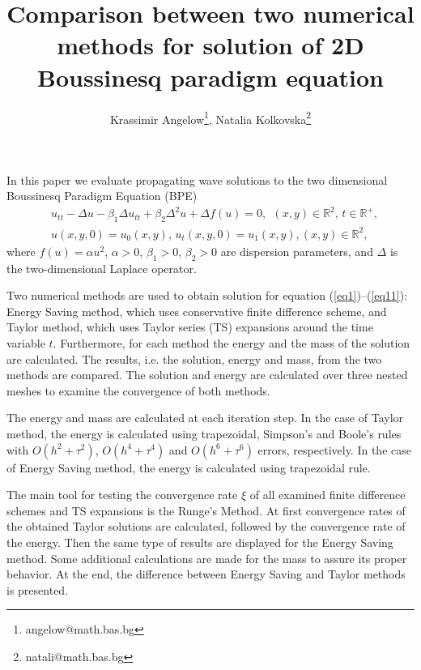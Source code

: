 \documentclass{article}
\newcommand{\RR}{\mathbb{R}}
\newcommand{\rf}[1]{(\ref{#1})}
\begin{document}
\title{Comparison between two numerical methods for solution of 2D Boussinesq paradigm equation}

\author{Krassimir Angelow\thanks{angelow@math.bas.bg}, Natalia Kolkovska\thanks{natali@math.bas.bg}}

\maketitle





In this paper we evaluate propagating wave solutions to the two dimensional Boussinesq Paradigm Equation (BPE)
\begin{align} 
&u_{tt} - \Delta u -\beta_1  \Delta u_{tt} +\beta_2 \Delta ^2 u + \Delta f(u)=0,~~     (x,y) \in \RR^2, \, t\in\RR^+, \label{eq1}
\\ &u(x,y,0)=u_0(x,y), \, u_t(x,y,0)=u_1(x,y),   (x,y) \in \RR^2,~~\label{eq11}
\end{align}
where $f(u)=\alpha u^2$,  $\alpha>0$, $\beta_1>0$, $\beta_2>0$  are dispersion parameters, and $\Delta$ is the two-dimensional Laplace operator. 

Two numerical methods are used to obtain solution for equation \rf{eq1}--\rf{eq11}: Energy Saving method, which uses conservative finite difference scheme, and Taylor method, which uses Taylor series (TS) expansions around the time variable $t$. Furthermore, for each method the energy and the mass of the solution are calculated. The results, i.e. the solution, energy and mass, from the two methods are compared.
 The solution and energy are calculated over three nested meshes to examine the convergence of both methods. 

The energy and mass are  calculated at each iteration step. In the case of Taylor method, the energy is calculated using trapezoidal, Simpson's and Boole's rules with $O(h^{2} + \tau^2 )$, $O(h^{4} + \tau^4 )$ and $O(h^{6} + \tau^6 )$ errors, respectively. In the case of Energy Saving method, the energy is calculated using trapezoidal rule. 

The main tool for testing the convergence rate $\xi$ of all examined finite difference schemes and TS expansions is the Runge's Method. 
At first convergence rates of the obtained Taylor solutions are calculated, followed by the convergence rate of the energy. Then the same type of results are displayed for the Energy Saving method. Some additional calculations are made for the mass to assure its proper behavior. At the end, the difference between Energy Saving and Taylor methods is presented. 
 
\end{document}
